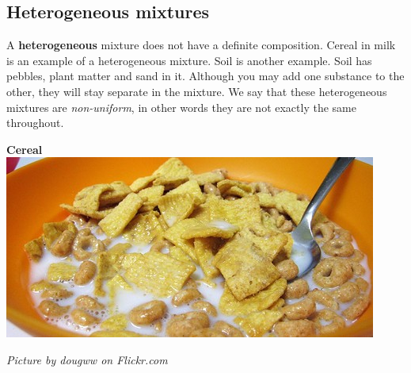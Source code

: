             \subsection*{Heterogeneous mixtures}
            \nopagebreak
A \textbf{heterogeneous} mixture does not have a definite composition. Cereal in milk is an example of a heterogeneous mixture. Soil is another example. Soil has pebbles, plant matter and sand in it. Although you may add one substance to the other, they will stay separate in the mixture. We say that these heterogeneous mixtures are \textsl{non-uniform}, in other words they are not exactly the same throughout.\\
\begin{minipage}{.5\textwidth}
\begin{center}
\textbf{Cereal}\\
 \includegraphics[width=.8\textwidth]{photos/mixtureby-dougww-flickr.jpg}\par
\textit{Picture by dougww on Flickr.com}
\end{center}
\end{minipage}
